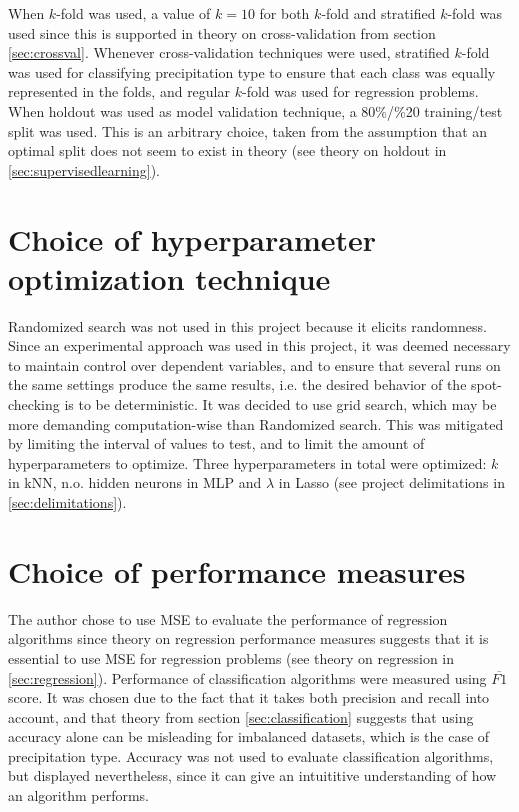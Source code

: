 	When $k$-fold was used, a value of $k= 10$ for both $k$-fold and stratified $k$-fold was used since this is supported in theory on cross-validation from section \ref{sec:crossval}. Whenever cross-validation techniques were used, stratified $k$-fold was used for classifying precipitation type to ensure that each class was equally represented in the folds, and regular $k$-fold was used for regression problems. When holdout was used as model validation technique, a 80\%/\%20 training/test split was used. This is an arbitrary choice, taken from the assumption that an optimal split does not seem to exist in theory (see theory on holdout in   \ref{sec:supervisedlearning}).

\section{Choice of hyperparameter optimization technique} \label{sec:hyper_opt_techniques}
	Randomized search was not used in this project because it elicits randomness. Since an experimental approach was used in this project, it was deemed necessary to maintain control over dependent variables, and to ensure that several runs on the same settings produce the same results, i.e. the desired behavior of the spot-checking is to be deterministic. It was decided to use grid search, which may be more demanding computation-wise than Randomized search. This was mitigated by limiting the interval of values to test, and to limit the amount of hyperparameters to optimize. Three hyperparameters in total were optimized: $k$ in kNN, n.o. hidden neurons in MLP and $\lambda$ in Lasso (see project delimitations in \ref{sec:delimitations}).

\section{Choice of performance measures}
	The author chose to use MSE to evaluate the performance of regression algorithms since theory on regression performance measures suggests that it is essential to use MSE for regression problems (see theory on regression in \ref{sec:regression}). Performance of classification algorithms were measured using $\overline{F1}$ score. It was chosen due to the fact that it takes both precision and recall into account, and that theory from section \ref{sec:classification} suggests that using accuracy alone can be misleading for imbalanced datasets, which is the case of precipitation type. Accuracy was not used to evaluate classification algorithms, but displayed nevertheless, since it can give an intuititive understanding of how an algorithm performs.

